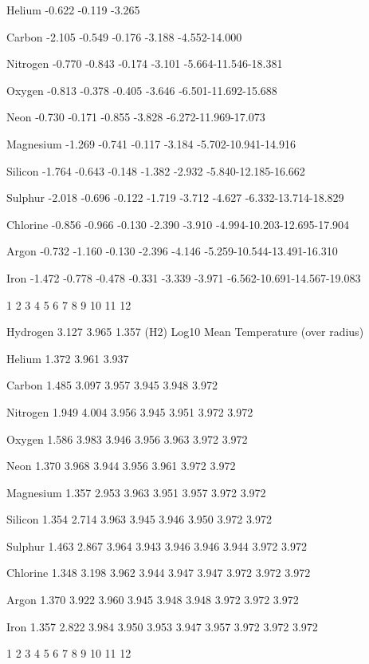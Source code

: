 { Helium     -0.622 -0.119 -3.265

 Carbon     -2.105 -0.549 -0.176 -3.188 -4.552-14.000

 Nitrogen   -0.770 -0.843 -0.174 -3.101 -5.664-11.546-18.381

 Oxygen     -0.813 -0.378 -0.405 -3.646 -6.501-11.692-15.688

 Neon       -0.730 -0.171 -0.855 -3.828 -6.272-11.969-17.073

 Magnesium  -1.269 -0.741 -0.117 -3.184 -5.702-10.941-14.916

 Silicon    -1.764 -0.643 -0.148 -1.382 -2.932 -5.840-12.185-16.662

 Sulphur    -2.018 -0.696 -0.122 -1.719 -3.712 -4.627 -6.332-13.714-18.829

 Chlorine   -0.856 -0.966 -0.130 -2.390 -3.910 -4.994-10.203-12.695-17.904

 Argon      -0.732 -1.160 -0.130 -2.396 -4.146 -5.259-10.544-13.491-16.310

 Iron       -1.472 -0.778 -0.478 -0.331 -3.339 -3.971
-6.562-10.691-14.567-19.083


               1      2      3      4      5      6      7      8      9
10     11     12    

 Hydrogen    3.127  3.965  1.357 (H2)                 Log10 Mean Temperature
(over radius)

 Helium      1.372  3.961  3.937

 Carbon      1.485  3.097  3.957  3.945  3.948  3.972

 Nitrogen    1.949  4.004  3.956  3.945  3.951  3.972  3.972

 Oxygen      1.586  3.983  3.946  3.956  3.963  3.972  3.972

 Neon        1.370  3.968  3.944  3.956  3.961  3.972  3.972

 Magnesium   1.357  2.953  3.963  3.951  3.957  3.972  3.972

 Silicon     1.354  2.714  3.963  3.945  3.946  3.950  3.972  3.972

 Sulphur     1.463  2.867  3.964  3.943  3.946  3.946  3.944  3.972  3.972

 Chlorine    1.348  3.198  3.962  3.944  3.947  3.947  3.972  3.972  3.972

 Argon       1.370  3.922  3.960  3.945  3.948  3.948  3.972  3.972  3.972

 Iron        1.357  2.822  3.984  3.950  3.953  3.947  3.957  3.972  3.972
3.972

               1      2      3      4      5      6      7      8      9
10     11     12    

}
